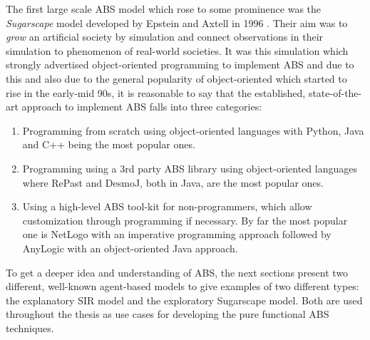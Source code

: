 The first large scale ABS model which rose to some prominence was the \textit{Sugarscape} model developed by Epstein and Axtell in 1996 \cite{epstein_growing_1996}. Their aim was to \textit{grow} an artificial society by simulation and connect observations in their simulation to phenomenon of real-world societies. It was this simulation which strongly advertised object-oriented programming to implement ABS and due to this and also due to the general popularity of object-oriented which started to rise in the early-mid 90s, it is reasonable to say that the established, state-of-the-art approach to implement ABS falls into three categories: %
\begin{enumerate}
	\item Programming from scratch using object-oriented languages with Python, Java and C++ being the most popular ones.
	\item Programming using a 3rd party ABS library using object-oriented languages where RePast and DesmoJ, both in Java, are the most popular ones.
	\item Using a high-level ABS tool-kit for non-programmers, which allow customization through programming if necessary. By far the most popular one is NetLogo with an imperative programming approach followed by AnyLogic with an object-oriented Java approach.
\end{enumerate}

To get a deeper idea and understanding of ABS, the next sections present two different, well-known agent-based models to give examples of two different types: the explanatory SIR model and the exploratory Sugarscape model. Both are used throughout the thesis as use cases for developing the pure functional ABS techniques.




